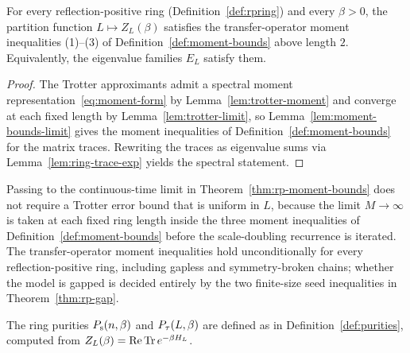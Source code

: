 \begin{theorem}
  \label{thm:rp-moment-bounds}
  \leanok
  For every reflection-positive ring (Definition~\ref{def:rpring}) and every \(\beta > 0\), the
  partition function \(L \mapsto Z_L(\beta)\) satisfies the transfer-operator moment inequalities
  (1)--(3) of Definition~\ref{def:moment-bounds} above length \(2\). Equivalently, the eigenvalue
  families \(E_L\) satisfy them.
\end{theorem}
\begin{proof}
  \leanok
  The Trotter approximants admit a spectral moment representation~\eqref{eq:moment-form} by
  Lemma~\ref{lem:trotter-moment} and converge at each fixed length by Lemma~\ref{lem:trotter-limit},
  so Lemma~\ref{lem:moment-bounds-limit} gives the moment inequalities of
  Definition~\ref{def:moment-bounds} for the matrix traces. Rewriting the traces as eigenvalue sums
  via Lemma~\ref{lem:ring-trace-exp} yields the spectral statement.
\end{proof}

\begin{remark}
  Passing to the continuous-time limit in Theorem~\ref{thm:rp-moment-bounds} does not require a
  Trotter error bound that is uniform in \(L\), because the limit \(M \to \infty\) is taken at each
  fixed ring length inside the three moment inequalities of Definition~\ref{def:moment-bounds}
  before the scale-doubling recurrence is iterated. The transfer-operator moment inequalities hold
  unconditionally for every reflection-positive ring, including gapless and symmetry-broken chains;
  whether the model is gapped is decided entirely by the two finite-size seed inequalities in
  Theorem~\ref{thm:rp-gap}.
\end{remark}

\begin{definition}
  \label{def:rp-purities}
  \leanok
  The ring purities \(P_{\mathrm{s}}(n, \beta)\) and \(P_{\tau}(L, \beta)\) are defined as in
  Definition~\ref{def:purities}, computed from \(Z_L(\beta) = \operatorname{Re}\operatorname{Tr} e^{-\beta H_L}\).
\end{definition}

